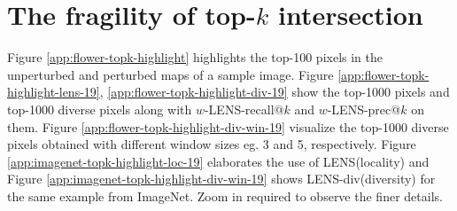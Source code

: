 \documentclass[letterpaper]{article} %
\begin{document}
\section{The fragility of top-$k$ intersection} \label{app:sample-fragility-examples}

Figure \ref{app:flower-topk-highlight} highlights the top-100 pixels in the unperturbed and perturbed maps of a sample image. Figure \ref{app:flower-topk-highlight-lens-19}, \ref{app:flower-topk-highlight-div-19} show the top-1000 pixels and top-1000 diverse pixels along with $w$-LENS-recall@$k$ and $w$-LENS-prec@$k$ on them. Figure \ref{app:flower-topk-highlight-div-win-19} visualize the top-1000 diverse pixels obtained with different window sizes eg. 3 and 5, respectively. Figure \ref{app:imagenet-topk-highlight-loc-19} elaborates the use of LENS(locality) and Figure \ref{app:imagenet-topk-highlight-div-win-19} shows LENS-div(diversity) for the same example from ImageNet. Zoom in required to observe the finer details.
\end{document}
